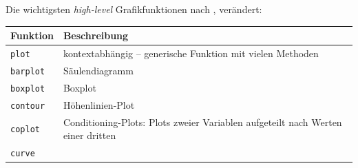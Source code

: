 \documentclass[]{book}
\begin{document}
Die wichtigsten \emph{high-level} Grafikfunktionen nach \citet{Ligges2008}, verändert:

\begin{longtable}[]{@{}ll@{}}
\toprule
\begin{minipage}[b]{0.38\columnwidth}\raggedright
Funktion\strut
\end{minipage} & \begin{minipage}[b]{0.56\columnwidth}\raggedright
Beschreibung\strut
\end{minipage}\tabularnewline
\midrule
\endhead
\begin{minipage}[t]{0.38\columnwidth}\raggedright
\texttt{plot}\strut
\end{minipage} & \begin{minipage}[t]{0.56\columnwidth}\raggedright
kontextabhängig -- generische Funktion mit vielen Methoden\strut
\end{minipage}\tabularnewline
\begin{minipage}[t]{0.38\columnwidth}\raggedright
\texttt{barplot}\strut
\end{minipage} & \begin{minipage}[t]{0.56\columnwidth}\raggedright
Säulendiagramm\strut
\end{minipage}\tabularnewline
\begin{minipage}[t]{0.38\columnwidth}\raggedright
\texttt{boxplot}\strut
\end{minipage} & \begin{minipage}[t]{0.56\columnwidth}\raggedright
Boxplot\strut
\end{minipage}\tabularnewline
\begin{minipage}[t]{0.38\columnwidth}\raggedright
\texttt{contour}\strut
\end{minipage} & \begin{minipage}[t]{0.56\columnwidth}\raggedright
Höhenlinien-Plot\strut
\end{minipage}\tabularnewline
\begin{minipage}[t]{0.38\columnwidth}\raggedright
\texttt{coplot}\strut
\end{minipage} & \begin{minipage}[t]{0.56\columnwidth}\raggedright
Conditioning-Plots: Plots zweier Variablen aufgeteilt nach Werten einer dritten\strut
\end{minipage}\tabularnewline
\begin{minipage}[t]{0.38\columnwidth}\raggedright
\texttt{curve}\strut
\end{minipage} & \begin{minipage}[t]{0.56\columnwidth}\raggedright

\end{minipage}
\end{longtable}
\end{document}
